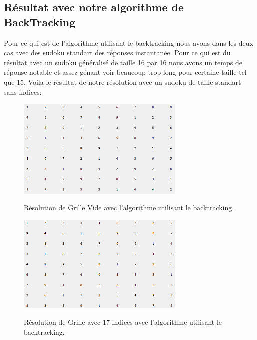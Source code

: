 \subsection{Résultat avec notre algorithme de BackTracking}
Pour ce qui est de l'algorithme utilisant le backtracking nous avons dans les deux cas avec des sudoku standart des réponses instantanée. Pour ce qui est du résultat avec un sudoku généralisé de taille 16 par 16 nous avons un temps de réponse notable et assez génant voir beaucoup trop long pour certaine taille tel que 15.\newline
Voila le résultat de notre résolution avec un sudoku de taille standart sans indices:

\begin{figure}[h]
  \begin{center}
\includegraphics[width=8cm]{./images/Res_Back_Vide.png}\label{Test_Back}
\caption{Résolution de Grille Vide avec l'algorithme utilisant le backtracking.}
\end{center}
\end{figure}


\begin{figure}[h]
  \begin{center}
\includegraphics[width=8cm]{./images/Res_Back_17.png}\label{Test_Back_17}
\caption{Résolution de Grille avec 17 indices avec l'algorithme utilisant le backtracking.}
\end{center}
\end{figure}


